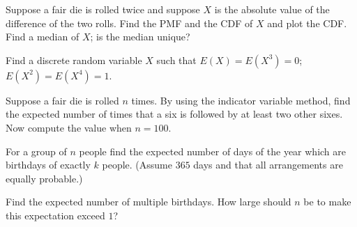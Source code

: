 \begin{problem}[Handout 6, \# 5]
  Suppose a fair die is rolled twice and suppose \(X\) is the absolute
  value of the difference of the two rolls. Find the PMF and the CDF of
  \(X\) and plot the CDF. Find a median of \(X\); is the median unique?
\end{problem}
\begin{solution*}
\end{solution*}

\begin{problem}[Handout 6, \# 7]
  Find a discrete random variable \(X\) such that \(E(X)=E(X^3)=0\);
  \(E(X^2)=E(X^4)=1\).
\end{problem}
\begin{solution*}
\end{solution*}

\begin{problem}
  Suppose a fair die is rolled \(n\) times. By using the indicator variable
  method, find the expected number of times that a six is followed by at
  least two other sixes. Now compute the value when \(n=100\).
\end{problem}
\begin{solution*}
\end{solution*}

\begin{problem}
  For a group of \(n\) people find the expected number of days of the year
  which are birthdays of exactly \(k\) people. (Assume \(365\) days and
  that all arrangements are equally probable.)
\end{problem}
\begin{solution*}
\end{solution*}

\begin{problem}
  Find the expected number of multiple birthdays. How large should \(n\) be
  to make this expectation exceed \(1\)?
\end{problem}
\begin{solution*}
\end{solution*}

